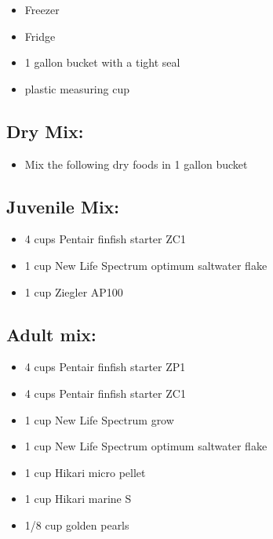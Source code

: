 \documentclass[
]{book}
\providecommand{\tightlist}{%
  \setlength{\itemsep}{0pt}\setlength{\parskip}{0pt}}
\begin{document}
\begin{itemize}
\tightlist
\item
  Freezer
\item
  Fridge
\item
  1 gallon bucket with a tight seal
\item
  plastic measuring cup
\end{itemize}

\hypertarget{dry-mix}{%
\subsection{Dry Mix:}\label{dry-mix}}

\begin{itemize}
\tightlist
\item
  Mix the following dry foods in 1 gallon bucket
\end{itemize}

\hypertarget{juvenile-mix}{%
\subsection{Juvenile Mix:}\label{juvenile-mix}}

\begin{itemize}
\tightlist
\item
  4 cups Pentair finfish starter ZC1
\item
  1 cup New Life Spectrum optimum saltwater flake
\item
  1 cup Ziegler AP100
\end{itemize}

\hypertarget{adult-mix}{%
\subsection{Adult mix:}\label{adult-mix}}

\begin{itemize}
\tightlist
\item
  4 cups Pentair finfish starter ZP1
\item
  4 cups Pentair finfish starter ZC1
\item
  1 cup New Life Spectrum grow
\item
  1 cup New Life Spectrum optimum saltwater flake
\item
  1 cup Hikari micro pellet
\item
  1 cup Hikari marine S
\item
  1/8 cup golden pearls
\end{itemize}
\end{document}

